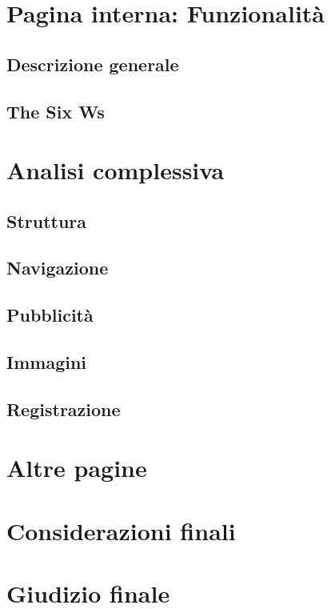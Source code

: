 \documentclass[11pt,a4paper]{article}
\begin{document}
\section{Pagina interna: Funzionalità}
\label{sec:secondary-page-analysis}

\subsection{Descrizione generale}
\label{subsec:internalpage-description}

\subsection{The Six Ws}
\label{subsec:internalpage-the-six-ws}

\section{Analisi complessiva}
\label{sec:full-analysis}

\subsection{Struttura}
\label{subsec:structure}

\subsection{Navigazione}
\label{subsec:navigation}

\subsection{Pubblicità}
\label{subsec:ads}

\subsection{Immagini}
\label{subsec:images}

\subsection{Registrazione}
\label{subsec:signup}

\section{Altre pagine}
\label{sec:other-pages}

\section{Considerazioni finali}
\label{sec:final-remarks}

\section{Giudizio finale}
\label{sec:final-vote}
\end{document}
